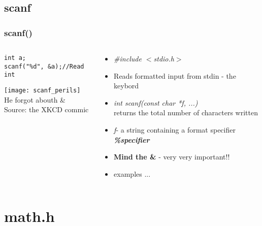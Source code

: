 \documentclass[10pt]{beamer}
\begin{document}
\subsection{scanf}

\begin{frame}[fragile]
  \frametitle{scanf()}
  \begin{columns}
    \begin{column}{0.5\textwidth}
\begin{lstlisting}
int a;
scanf("%d", &a);//Read int
\end{lstlisting}
\centering
\texttt{[image: scanf\_perils]}\\
He forgot abouth \& \\
{\tiny Source: the XKCD commic}
    \end{column}
    \begin{column}{0.5\textwidth}
      \begin{itemize}
        \item \textit{\#include $<$stdio.h$>$}
        \item Reads formatted input from stdin - the keybord
        \item \textit{int scanf(const char *f, ...)}\\
        returns the total number of characters written
        \item \textit{f}- a string containing a format specifier \textit{\textbf{\%specifier}}
        \item \textbf{Mind the \&} - very very important!!
        \item examples ...
      \end{itemize}
    \end{column}
  \end{columns}
\end{frame}

\section{math.h}
\end{document}
